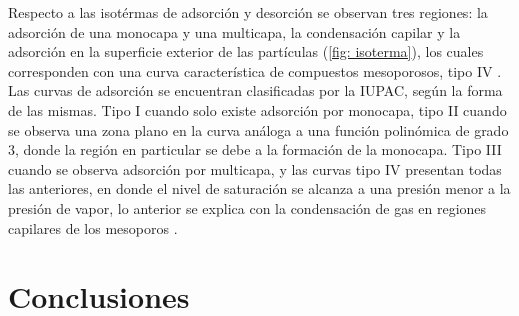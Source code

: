 \documentclass[fleqn,11pt]{SelfArx}
\begin{document}
	Respecto a las isot\'ermas de adsorci\'on y desorci\'on se observan tres regiones: la adsorci\'on de una monocapa y una multicapa, la condensaci\'on capilar y la adsorci\'on en la superficie exterior de las part\'iculas (\autoref{fig: isoterma}), los cuales corresponden con una curva caracter\'istica de compuestos mesoporosos, tipo IV \cite{vargas_legnoverde_giraldo_basaldella_moreno-pirajan_2010}. Las curvas de adsorci\'on se encuentran clasificadas por la IUPAC, seg\'un la forma de las mismas. Tipo I cuando solo existe adsorci\'on por monocapa, tipo II cuando se observa una zona plano en la curva an\'aloga a una funci\'on polin\'omica de grado 3, donde la regi\'on en particular se debe a la formaci\'on de la monocapa. Tipo III cuando se observa adsorci\'on por multicapa, y las curvas tipo IV presentan todas las anteriores, en donde el nivel de saturaci\'on se alcanza a una presi\'on menor a la presi\'on de vapor, lo anterior se explica con la condensaci\'on de gas en  regiones capilares de los mesoporos \cite{sing_2001}.
	
	\section{Conclusiones}
	
	
	
	
	
\end{document}
